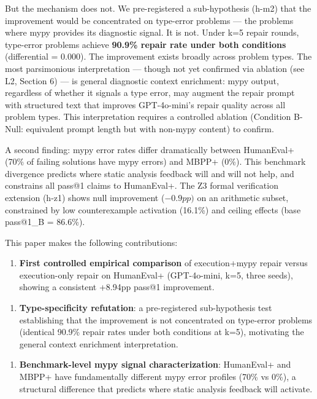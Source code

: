 But the mechanism does not. We pre-registered a sub-hypothesis (h-m2) that the improvement would be concentrated on type-error problems --- the problems where mypy provides its diagnostic signal. It is not. Under k=5 repair rounds, type-error problems achieve \textbf{90.9\% repair rate under both conditions} (differential = 0.000). The improvement exists broadly across problem types. The most parsimonious interpretation --- though not yet confirmed via ablation (see L2, Section 6) --- is general diagnostic context enrichment: mypy output, regardless of whether it signals a type error, may augment the repair prompt with structured text that improves GPT-4o-mini's repair quality across all problem types. This interpretation requires a controlled ablation (Condition B-Null: equivalent prompt length but with non-mypy content) to confirm.

A second finding: mypy error rates differ dramatically between HumanEval+ (70\% of failing solutions have mypy errors) and MBPP+ (0\%). This benchmark divergence predicts where static analysis feedback will and will not help, and constrains all pass@1 claims to HumanEval+. The Z3 formal verification extension (h-z1) shows null improvement ($-0.9pp)$ on an arithmetic subset, constrained by low counterexample activation (16.1\%) and ceiling effects (base pass@1\_B = 86.6\%).

This paper makes the following contributions:

\begin{enumerate}
\item \textbf{First controlled empirical comparison} of execution+mypy repair versus execution-only repair on HumanEval+ (GPT-4o-mini, k=5, three seeds), showing a consistent +8.94pp pass@1 improvement.
\end{enumerate}

\begin{enumerate}
\item \textbf{Type-specificity refutation}: a pre-registered sub-hypothesis test establishing that the improvement is not concentrated on type-error problems (identical 90.9\% repair rates under both conditions at k=5), motivating the general context enrichment interpretation.
\end{enumerate}

\begin{enumerate}
\item \textbf{Benchmark-level mypy signal characterization}: HumanEval+ and MBPP+ have fundamentally different mypy error profiles (70\% vs 0\%), a structural difference that predicts where static analysis feedback will activate.
\end{enumerate}

